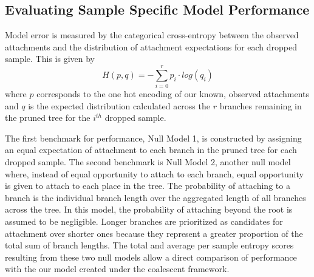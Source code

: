 \documentclass[11pt,oneside,letterpaper]{article}
\newcommand\tab[1][1cm]{\hspace*{#1}}
\begin{document}
\subsection*{Evaluating Sample Specific Model Performance}
\tab Model error is measured by the categorical cross-entropy between the observed attachments and the distribution of attachment expectations for each dropped sample. This is given by
\begin{equation}
	H(p,q) = - \sum_{i=0}^r p_i \cdot log(q_i)
\end{equation}
where $p$ corresponds to the one hot encoding of our known, observed attachments and $q$ is the expected distribution calculated across the $r$ branches remaining in the pruned tree for the $i^{th}$ dropped sample. 

\tab The first benchmark for performance, Null Model 1, is constructed by assigning an equal expectation of attachment to each branch in the pruned tree for each dropped sample. The second benchmark is Null Model 2, another null model where, instead of equal opportunity to attach to each branch, equal opportunity is given to attach to each place in the tree. The probability of attaching to a branch is the individual branch length over the aggregated length of all branches across the tree. In this model, the probability of attaching beyond the root is assumed to be negligible. Longer branches are prioritized as candidates for attachment over shorter ones because they represent a greater proportion of the total sum of branch lengths. The total and average per sample entropy scores resulting from these two null models allow a direct comparison of performance with the our model created under the coalescent framework. 

\newpage


\end{document}
